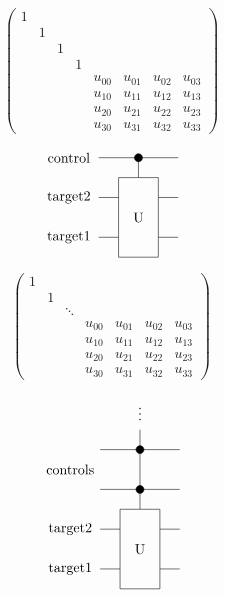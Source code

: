 \documentclass{article}
\begin{document}
\[
\begin{pmatrix}
1 \\
& 1 \\
& & 1 \\
& & & 1 \\
& & & & u_{00} & u_{01} & u_{02} & u_{03} \\
& & & & u_{10} & u_{11} & u_{12} & u_{13} \\
& & & & u_{20} & u_{21} & u_{22} & u_{23} \\
& & & & u_{30} & u_{31} & u_{32} & u_{33}
\end{pmatrix}
\]
\pagebreak

\[
             \begin{tikzpicture}[scale=.5]
             \node[draw=none] at (-3.5, 0) {target1};
             \node[draw=none] at (-3.5, 2) {target2};
             \node[draw=none] at (-3.5, 4) {control};      
             
             \draw (-2, 4) -- (2, 4);
             \draw[fill=black] (0, 4) circle (.2);
             \draw(0, 4) -- (0, 3);

             \draw (-2,0) -- (-1, 0);
             \draw (1, 0) -- (2, 0);
             \draw (-2,2) -- (-1, 2);
             \draw (1, 2) -- (2, 2);
             \draw (-1,-1)--(-1,3)--(1,3)--(1,-1)--cycle;
             \node[draw=none] at (0, 1) {U};
             \end{tikzpicture}
 \]
\pagebreak

\[
\begin{pmatrix}
1 \\
& 1 \\\
& & \ddots \\
& & & u_{00} & u_{01} & u_{02} & u_{03} \\
& & & u_{10} & u_{11} & u_{12} & u_{13} \\
& & & u_{20} & u_{21} & u_{22} & u_{23} \\
& & & u_{30} & u_{31} & u_{32} & u_{33}
\end{pmatrix}
\]
\pagebreak

\[
             \begin{tikzpicture}[scale=.5]
             \node[draw=none] at (-3.5, 0) {target1};
             \node[draw=none] at (-3.5, 2) {target2};
             \node[draw=none] at (-3.5, 5) {controls};
             
             \node[draw=none] at (0, 8) {$\vdots$};
             \draw (0, 7) -- (0, 6);
             
             \draw (-2, 6) -- (2, 6);
             \draw[fill=black] (0, 6) circle (.2);
             \draw (0, 6) -- (0, 4);         
             
             \draw (-2, 4) -- (2, 4);
             \draw[fill=black] (0, 4) circle (.2);
             \draw(0, 4) -- (0, 3);

             \draw (-2,0) -- (-1, 0);
             \draw (1, 0) -- (2, 0);
             \draw (-2,2) -- (-1, 2);
             \draw (1, 2) -- (2, 2);
             \draw (-1,-1)--(-1,3)--(1,3)--(1,-1)--cycle;
             \node[draw=none] at (0, 1) {U};
             \end{tikzpicture}
 \]
\pagebreak
\end{document}
